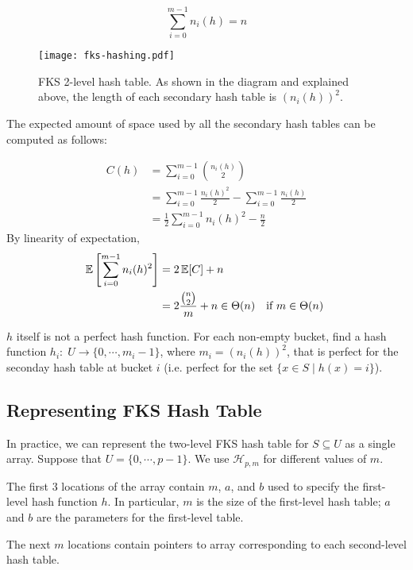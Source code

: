 $$
\sum_{i=0}^{m-1} n_i(h) = n
$$

\begin{figure}[htbp]
    \centering
    \texttt{[image: fks-hashing.pdf]}
    \vspace{2em}
    \caption{FKS 2-level hash table. As shown in the diagram and explained above, the length of each secondary hash table is $(n_i(h))^2$. }
    \label{fig:fks-hashing}
\end{figure}

The expected amount of space used by all the secondary hash tables can be computed as follows:

$$
\begin{aligned}
    C(h) &= \sum_{i=0}^{m-1} {n_i(h) \choose 2} \\
    &= \sum_{i=0}^{m-1} \frac{n_i(h)^2}{2} - \sum_{i=0}^{m-1} \frac{n_i(h)}{2} \\
    &= \frac{1}{2} \sum_{i=0}^{m-1} n_i(h)^2 - \frac{n}{2}
\end{aligned}
$$
By linearity of expectation,
$$
\begin{aligned}
    \operatorname*{\mathbb{E}}\left[ \sum_{i=0}^{m-1} n_i(h)^2 \right] &= 2 \operatorname*{\mathbb{E}}[C] + n \\
    &= 2\frac{{n \choose 2}}{m} + n \in \Theta(n) & \text{if $m \in \Theta(n)$ }
\end{aligned}
$$

$h$ itself is not a perfect hash function. For each non-empty bucket, find a hash function $h_i:\; U \to \{0,\cdots,m_i-1\}$, where $m_i = (n_i(h))^2$, that is perfect for the seconday hash table at bucket $i$ (i.e. perfect for the set $\{ x \in S \mid h(x) = i \}$).

\subsection{Representing FKS Hash Table}

In practice, we can represent the two-level FKS hash table for $S \subseteq U$ as a single array. Suppose that $U = \{ 0, \cdots, p-1 \}$. We use $\mathcal{H}_{p,m}$ for different values of $m$.

The first 3 locations of the array contain $m$, $a$, and $b$ used to specify the first-level hash function $h$. In particular, $m$ is the size of the first-level hash table; $a$ and $b$ are the parameters for the first-level table.

The next $m$ locations contain pointers to array corresponding to each second-level hash table.

